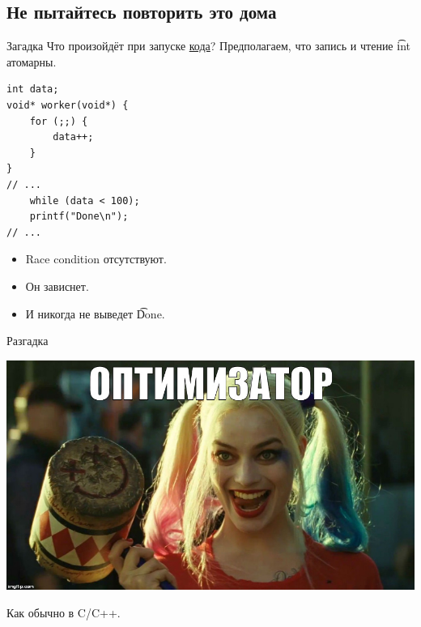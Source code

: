 \subsection{Не пытайтесь повторить это дома}

\begin{frame}
\end{frame}

\begin{frame}[fragile]{Загадка}
	Что произойдёт при запуске \href{https://github.com/yeputons/fall-2017-paradigms/raw/master/171113/sources/01-optimizer.cpp}{кода}?
	Предполагаем, что запись и чтение \t{int} атомарны.
\begin{verbatim}
int data;
void* worker(void*) {
    for (;;) {
        data++;
    }
}
// ...
    while (data < 100);
    printf("Done\n");
// ...
\end{verbatim}
	\begin{itemize}
		\pause\item Race condition отсутствуют.
		\pause\item Он зависнет.
		\pause\item И никогда не выведет \t{Done}.
	\end{itemize}
\end{frame}

\begin{frame}{Разгадка}
	\begin{center}
		\includegraphics[scale=0.3]{optimizer.jpg}
	\end{center}
	Как обычно в C/C++.
\end{frame}

